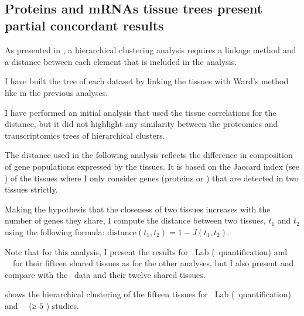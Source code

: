 \FloatBarrier\

\vspace{-8mm}
\subsection{Proteins and mRNAs tissue trees present partial concordant results\quad}
\vspace{-5mm}

As presented in ,
a hierarchical clustering analysis requires
a linkage method and
a distance between each element that is included in the analysis.\mybr\

I have built the tree of each dataset by linking the tissues
with Ward's method~ like in the previous analyses.\mybr\

I have performed an initial analysis that
used the tissue correlations for the distance,
but it did not highlight any similarity
between the proteomics and transcriptomics trees of hierarchical clusters.\mybr\

The distance used in the following analysis reflects
the difference in composition of gene populations expressed by the tissues.
It is based on the Jaccard index (see ) of the tissues
where I only consider genes (proteins or \mRNAs)
that are detected in two tissues strictly.\mybr\

Making the hypothesis that
the closeness of two tissues increases with the number of genes they share,
I compute the distance between two tissues, $t_1$ and $t_2$
using the following formula:
$\text{distance}(t_1,t_2)= 1 - J(t_{1},t_{2})$.

Note that for this analysis,
I present the results for \pandey\ Lab (\PPKM\ quantification) and \uhlen\ \etal\
for their fifteen shared tissues as for the other analyses,
but I also present and compare with the \gtex\ data and their twelve shared tissues.\mybr\

 shows the hierarchical clustering of the fifteen tissues
for \pandey\ Lab (\PPKM\ quantification)
and \uhlen\ \etal\ (≥ $5$ \FPKM)  studies.\mybr\

